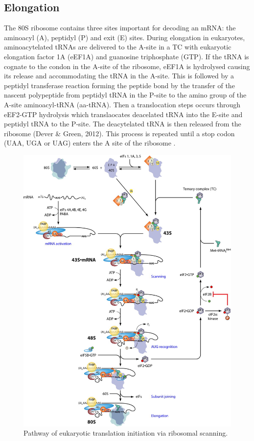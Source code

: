 \documentclass[12pt,openany]{book}
\begin{document}
\subsection{Elongation}

The 80S ribosome contains three sites important for decoding an mRNA:
the aminoacyl (A), peptidyl (P) and exit (E) sites. During elongation in
eukaryotes, aminoacytelated tRNAs are delivered to the A-site in a TC
with eukaryotic elongation factor 1A (eEF1A) and guanosine triphosphate
(GTP). If the tRNA is cognate to the condon in the A-site of the
ribosome, eEF1A is hydrolysed causing its release and accommodating the
tRNA in the A-site. This is followed by a peptidyl transferase reaction
forming the peptide bond by the transfer of the nascent polypeptide from
peptidyl tRNA in the P-site to the amino group of the A-site
aminoacyl-tRNA (aa-tRNA). Then a translocation steps occurs through
eEF2-GTP hydrolysis which translaocates deacelated tRNA into the E-site
and peptidyl tRNA to the P-site. The deacytelated tRNA is then released
from the ribosome (Dever \& Green, 2012). This process is repeated until
a stop codon (UAA, UGA or UAG) enters the A site of the ribosome .

\begin{figure}[ht]
\includegraphics{./figures/initiation.jpg} 
  \caption{Pathway of eukaryotic translation initiation via ribosomal scanning.
  \label{fig:initiation}}
\end{figure}
\end{document}
